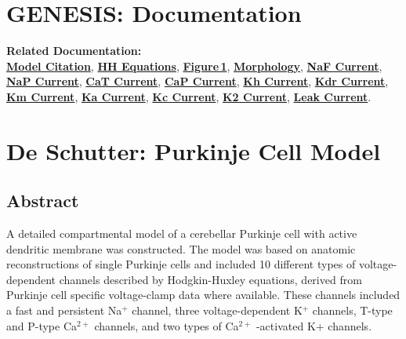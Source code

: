 \documentclass[12pt]{article}
\begin{document}
\section*{GENESIS: Documentation}

{\bf Related Documentation:}\\
\href{../pub-purkinje-deschutter1-citation/pub-purkinje-deschutter1-citation.tex}{\bf Model Citation}, 
\href{../pub-purkinje-deschutter1-equations1/pub-purkinje-deschutter1-equations1.tex}{\bf HH Equations},
\href{../pub-purkinje-deschutter1-fig-1/pub-purkinje-deschutter1-fig-1.tex}{\bf Figure\,1},
\href{../pub-purkinje-deschutter1-morphology/pub-purkinje-deschutter1-morphology.tex}{\bf Morphology},
\href{../pub-purkinje-deschutter1-conductance1-naf1/pub-purkinje-deschutter1-conductance1-naf1.tex}{\bf NaF Current},
\href{../pub-purkinje-deschutter1-conductance1-nap1/pub-purkinje-deschutter1-conductance1-nap1.tex}{\bf NaP Current},
\href{../pub-purkinje-deschutter1-conductance1-cat1/pub-purkinje-deschutter1-conductance1-cat1.tex}{\bf CaT Current},
\href{../pub-purkinje-deschutter1-conductance1-cap1/pub-purkinje-deschutter1-conductance1-cap1.tex}{\bf CaP Current},
\href{../pub-purkinje-deschutter1-conductance1-kh1/pub-purkinje-deschutter1-conductance1-kh1.tex}{\bf Kh Current},
\href{../pub-purkinje-deschutter1-conductance1-kdr1/pub-purkinje-deschutter1-conductance1-kdr1.tex}{\bf Kdr Current},
\href{../pub-purkinje-deschutter1-conductance1-km1/pub-purkinje-deschutter1-conductance1-km1.tex}{\bf Km Current},
\href{../pub-purkinje-deschutter1-conductance1-ka1/pub-purkinje-deschutter1-conductance1-ka1.tex}{\bf Ka Current},
\href{../pub-purkinje-deschutter1-conductance1-kc1/pub-purkinje-deschutter1-conductance1-kc1.tex}{\bf Kc Current},
\href{../pub-purkinje-deschutter1-conductance1-k2/pub-purkinje-deschutter1-conductance1-k2.tex}{\bf K2 Current},
\href{../pub-purkinje-deschutter1-conductance1-leak1/pub-purkinje-deschutter1-conductance1-leak1.tex}{\bf Leak Current}.

\section*{De Schutter: Purkinje Cell Model}

\subsection*{Abstract}

A detailed compartmental model of a cerebellar Purkinje
cell with active dendritic membrane was constructed. The model
was based on anatomic reconstructions of single Purkinje cells and
included 10 different types of voltage-dependent channels described
by Hodgkin-Huxley equations, derived from Purkinje cell specific
voltage-clamp data where available. These channels included
a fast and persistent Na$^+$ channel, three voltage-dependent
K$^+$ channels, T-type and P-type Ca$^{2+}$ channels, and two types of
Ca$^{2+}$ -activated K+ channels.
\end{document}
